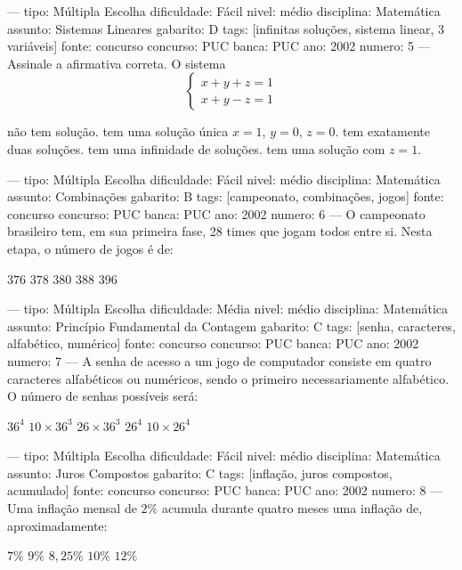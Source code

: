 ---
tipo: Múltipla Escolha
dificuldade: Fácil
nivel: médio
disciplina: Matemática
assunto: Sistemas Lineares
gabarito: D
tags: [infinitas soluções, sistema linear, 3 variáveis]
fonte: concurso
concurso: PUC
banca: PUC
ano: 2002
numero: 5
---
\question
Assinale a afirmativa correta. O sistema
$$\begin{cases} x + y + z = 1 \\ x + y - z = 1 \end{cases}$$
\begin{choices}
\choice não tem solução.
\choice tem uma solução única $x = 1$, $y = 0$, $z = 0$.
\choice tem exatamente duas soluções.
\CorrectChoice tem uma infinidade de soluções.
\choice tem uma solução com $z = 1$.
\end{choices}

---
tipo: Múltipla Escolha
dificuldade: Fácil
nivel: médio
disciplina: Matemática
assunto: Combinações
gabarito: B
tags: [campeonato, combinações, jogos]
fonte: concurso
concurso: PUC
banca: PUC
ano: 2002
numero: 6
---
\question
O campeonato brasileiro tem, em sua primeira fase, 28 times que jogam todos entre si. Nesta etapa, o número de jogos é de:
\begin{choices}
\choice $376$
\CorrectChoice $378$
\choice $380$
\choice $388$
\choice $396$
\end{choices}

---
tipo: Múltipla Escolha
dificuldade: Média
nivel: médio
disciplina: Matemática
assunto: Princípio Fundamental da Contagem
gabarito: C
tags: [senha, caracteres, alfabético, numérico]
fonte: concurso
concurso: PUC
banca: PUC
ano: 2002
numero: 7
---
\question
A senha de acesso a um jogo de computador consiste em quatro caracteres alfabéticos ou numéricos, sendo o primeiro necessariamente alfabético. O número de senhas possíveis será:
\begin{choices}
\choice $36^4$
\choice $10 \times 36^3$
\CorrectChoice $26 \times 36^3$
\choice $26^4$
\choice $10 \times 26^4$
\end{choices}

---
tipo: Múltipla Escolha
dificuldade: Fácil
nivel: médio
disciplina: Matemática
assunto: Juros Compostos
gabarito: C
tags: [inflação, juros compostos, acumulado]
fonte: concurso
concurso: PUC
banca: PUC
ano: 2002
numero: 8
---
\question
Uma inflação mensal de $2\%$ acumula durante quatro meses uma inflação de, aproximadamente:
\begin{choices}
\choice $7\%$
\choice $9\%$
\CorrectChoice $8{,}25\%$
\choice $10\%$
\choice $12\%$
\end{choices}

